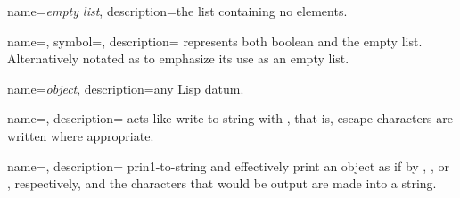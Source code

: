 {
  name={\sl empty list},
  description={the list containing no elements.}
}


{
  name={},
  symbol={\lsp{()}},
  description={%
    represents both boolean  and the \gls{empty list}.
    Alternatively notated as 
    to emphasize its use as an \gls{empty list}.
  }
}


{
  name={\sl object},
  description={any Lisp datum.}
}


{
  name={},
  description={%
    acts like \gls{write-to-string} with , that is,
    escape characters are written where appropriate.
  }
}


{
  name={},
  description={%
    \gls{prin1-to-string} and  effectively print an
    \gls{object} as if by , , or ,
    respectively, and the characters that would be output
    are made into a string.
  }
}
